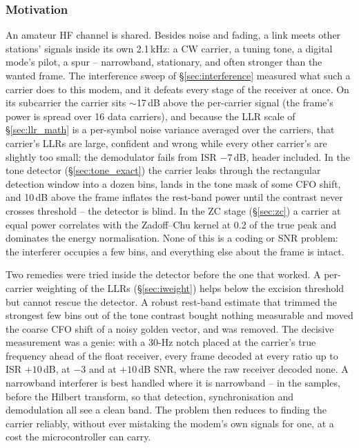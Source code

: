 \subsubsection*{Motivation}

An amateur HF channel is shared.  Besides noise and fading, a link
meets other stations' signals inside its own 2.1\,kHz: a CW carrier,
a tuning tone, a digital mode's pilot, a spur -- narrowband,
stationary, and often stronger than the wanted frame.  The
interference sweep of \S\ref{sec:interference} measured what such a
carrier does to this modem, and it defeats every stage of the
receiver at once.  On its subcarrier the carrier sits $\sim$17\,dB
above the per-carrier signal (the frame's power is spread over 16
data carriers), and because the LLR scale of \S\ref{sec:llr_math} is a
per-symbol noise variance averaged over the carriers, that carrier's
LLRs are large, confident and wrong while every other carrier's are
slightly too small: the demodulator fails from ISR $-7$\,dB, header
included.  In the tone detector (\S\ref{sec:tone_exact}) the carrier
leaks through the rectangular detection window into a dozen bins,
lands in the tone mask of some CFO shift, and 10\,dB above the frame
inflates the rest-band power until the contrast never crosses
threshold -- the detector is blind.  In the ZC stage
(\S\ref{sec:zc}) a carrier at equal power correlates with the
Zadoff--Chu kernel at 0.2 of the true peak and dominates the energy
normalisation.  None of this is a coding or SNR problem: the
interferer occupies a few bins, and everything else about the frame
is intact.

Two remedies were tried inside the detector before the one that
worked.  A per-carrier weighting of the LLRs (\S\ref{sec:iweight})
helps below the excision threshold but cannot rescue the detector.
A robust rest-band estimate that trimmed the strongest few bins out
of the tone contrast bought nothing measurable and moved the coarse
CFO shift of a noisy golden vector, and was removed.  The decisive
measurement was a genie: with a 30-Hz notch placed at the carrier's
true frequency ahead of the float receiver, every frame decoded at
every ratio up to ISR $+10$\,dB, at $-3$ and at $+10$\,dB SNR, where
the raw receiver decoded none.  A narrowband interferer is best
handled where it is narrowband -- in the samples, before the Hilbert
transform, so that detection, synchronisation and demodulation all
see a clean band.  The problem then reduces to finding the carrier
reliably, without ever mistaking the modem's own signals for one, at
a cost the microcontroller can carry.

